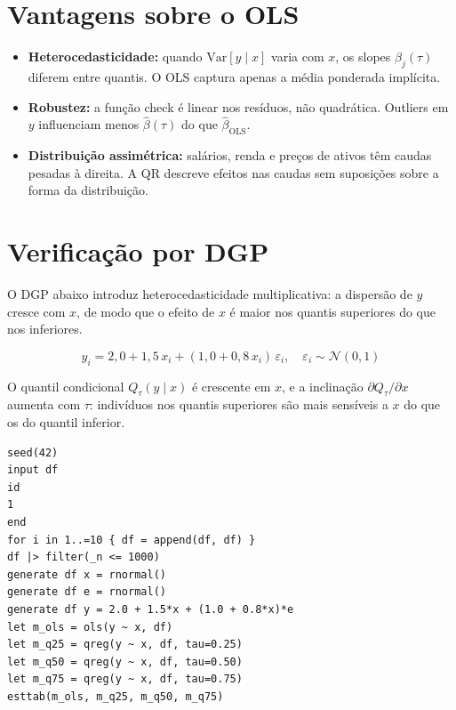 \section{Vantagens sobre o OLS}

\begin{itemize}
  \item \textbf{Heterocedasticidade:} quando $\mathrm{Var}[y \mid x]$ varia
        com $x$, os slopes $\beta_j(\tau)$ diferem entre quantis. O OLS
        captura apenas a média ponderada implícita.

  \item \textbf{Robustez:} a função check é linear nos resíduos, não
        quadrática. Outliers em $y$ influenciam menos $\hat\beta(\tau)$
        do que $\hat\beta_{\mathrm{OLS}}$.

  \item \textbf{Distribuição assimétrica:} salários, renda e preços de
        ativos têm caudas pesadas à direita. A QR descreve efeitos nas
        caudas sem suposições sobre a forma da distribuição.
\end{itemize}

\section{Verificação por DGP}

O DGP abaixo introduz heterocedasticidade multiplicativa: a dispersão
de $y$ cresce com $x$, de modo que o efeito de $x$ é maior nos quantis
superiores do que nos inferiores.

\[
  y_i = 2{,}0 + 1{,}5\,x_i + (1{,}0 + 0{,}8\,x_i)\,\varepsilon_i,
  \quad \varepsilon_i \sim \mathcal{N}(0,1)
\]

O quantil condicional $Q_\tau(y \mid x)$ é crescente em $x$, e a
inclinação $\partial Q_\tau / \partial x$ aumenta com $\tau$: indivíduos
nos quantis superiores são mais sensíveis a $x$ do que os do quantil
inferior.

\begin{lstlisting}[caption={DGP heterocedástico — OLS vs.\ quatro quantis}]
seed(42)
input df
id
1
end
for i in 1..=10 { df = append(df, df) }
df |> filter(_n <= 1000)
generate df x = rnormal()
generate df e = rnormal()
generate df y = 2.0 + 1.5*x + (1.0 + 0.8*x)*e
let m_ols = ols(y ~ x, df)
let m_q25 = qreg(y ~ x, df, tau=0.25)
let m_q50 = qreg(y ~ x, df, tau=0.50)
let m_q75 = qreg(y ~ x, df, tau=0.75)
esttab(m_ols, m_q25, m_q50, m_q75)
\end{lstlisting}

